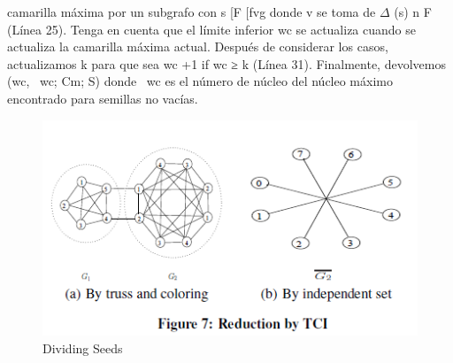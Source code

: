 camarilla máxima por un subgrafo con s [F [fvg donde v se toma de \begin{math}\Delta\end{math} (s) n F (Línea 25). Tenga en cuenta que el límite inferior wc se actualiza cuando se actualiza la camarilla máxima actual. Después de considerar los casos, actualizamos k para que sea wc +1 if wc ≥ k (Línea 31). Finalmente, devolvemos (wc, ~wc; Cm; S) donde ~wc es el número de núcleo del núcleo máximo encontrado para semillas no vacías.
\\
\begin{figure}[h!]
\centering
\includegraphics[scale=1]{img/imagen14.png}
\caption{Dividing Seeds}
\label{Comandos}
\end{figure}
\\

